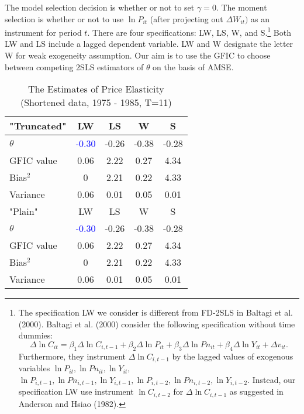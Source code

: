 The model selection decision is whether or not to set $\gamma = 0$. The moment selection is whether or not to use $\ln P_{it}$ (after projecting out $\Delta W_{it})$ as an instrument for period $t$.  There are four specifications:  LW, LS, W, and S.\footnote{The specification LW we consider is different from FD-2SLS in Baltagi et al. (2000). Baltagi et al. (2000) consider the following specification without time dummies:
 \[
\Delta \ln C_{it} = \beta_1 \Delta \ln C_{i,t-1} +  \beta_2 \Delta \ln P_{it} +\beta_3 \Delta \ln Pn_{it} +  \beta_4 \Delta \ln Y_{it} + \Delta v_{it}.
\]
Furthermore, they instrument $\Delta \ln C_{i,t-1}$ by the lagged values of exogenous variables $\ln P_{it}, \ln Pn_{it}, \ln Y_{it},$ $\ln P_{i,t-1}, \ln Pn_{i,t-1}, \ln Y_{i,t-1}, \ln P_{i,t-2}, \ln Pn_{i,t-2}, \ln Y_{i,t-2}$. Instead, our specification LW use instrument $\ln C_{i, t-2}$ for $\Delta \ln C_{i,t-1}$ as suggested in Anderson and Hsiao (1982).}
 Both LW and LS include a lagged dependent variable. LW and W designate the letter W for weak exogeneity assumption. Our aim is to use the GFIC to choose between competing 2SLS estimators of $\theta$ on the basis of AMSE. %
\newpage


\begin{table}[h!]\centering
 \caption{The Estimates of Price Elasticity (Shortened data, 1975 - 1985, T=11)}
\begin{tabular}{l c c c c }\hline\hline 
 "Truncated"& LW   &      LS   &       W   &      S\\
\hline
$\theta$ & \textcolor{blue}{-0.30} & -0.26 &  -0.38 &  -0.28\\
\hline
GFIC value &0.06 & 2.22 & 0.27 &  4.34\\
Bias$^2$ & 0 & 2.21 & 0.22 & 4.33\\
Variance & 0.06 & 0.01 & 0.05 & 0.01\\ 
\hline
 "Plain" & LW   &      LS   &       W   &      S\\
\hline
$\theta$ & \textcolor{blue}{-0.30} & -0.26 &  -0.38 &  -0.28\\
\hline
GFIC value &0.06 & 2.22 & 0.27 &  4.34\\
Bias$^2$ & 0 & 2.21 & 0.22 & 4.33\\
Variance & 0.06 & 0.01 & 0.05 & 0.01\\ 
\hline
\hline
\end{tabular}
\end{table}



